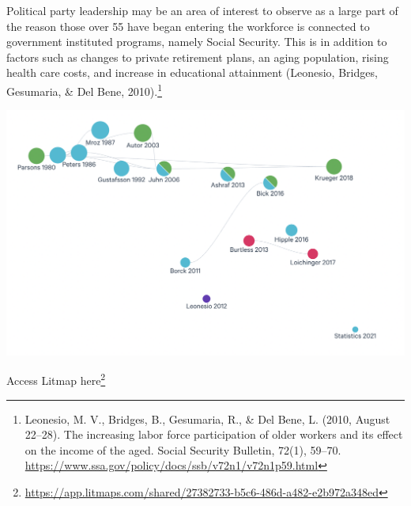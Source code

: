 Political party leadership may be an area of interest to observe as a large part of the reason those over 55 have began entering the workforce is connected to government instituted programs, namely Social Security. This is in addition to factors such as changes to private retirement plans, an aging population, rising health care costs, and increase in educational attainment (Leonesio, Bridges, Gesumaria, \& Del Bene, 2010).\footnote{Leonesio, M. V., Bridges, B., Gesumaria, R., \& Del Bene, L. (2010, August 22--28). The increasing labor force participation of older workers and its effect on the income of the aged. Social Security Bulletin, 72(1), 59--70. \href{https://www.ssa.gov/policy/docs/ssb/v72n1/v72n1p59.html}{https://www.ssa.gov/policy/docs/ssb/v72n1/v72n1p59.html}}

\includegraphics[width=0.7\linewidth]{files/litmap-ba9102f2e95757a03bd4124d2527438a.png}

Access Litmap here\footnote{\href{https://app.litmaps.com/shared/27382733-b5c6-486d-a482-e2b972a348ed}{https://app.litmaps.com/shared/27382733-b5c6-486d-a482-e2b972a348ed}}